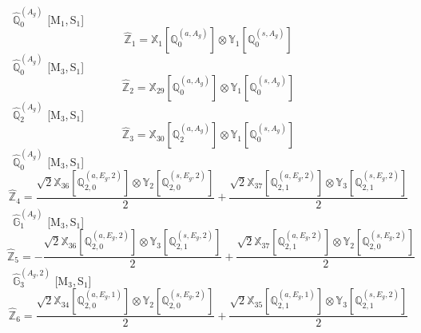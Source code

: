 \documentclass[fleqn,10pt,landscape]{article}
\begin{document}
\begin{itemize}
\vspace{4mm}
\noindent {} $\,\,\,\hat{\mathbb{Q}}_{0}^{(A_{g})}$ [M$_{1}$,\,S$_{1}$]
\begin{dmath*}
\hat{\mathbb{Z}}_{1}=\mathbb{X}_{1}[\mathbb{Q}_{0}^{(a,A_{g})}] \otimes\mathbb{Y}_{1}[\mathbb{Q}_{0}^{(s,A_{g})}]
\end{dmath*}
\vspace{4mm}
\noindent {} $\,\,\,\hat{\mathbb{Q}}_{0}^{(A_{g})}$ [M$_{3}$,\,S$_{1}$]
\begin{dmath*}
\hat{\mathbb{Z}}_{2}=\mathbb{X}_{29}[\mathbb{Q}_{0}^{(a,A_{g})}] \otimes\mathbb{Y}_{1}[\mathbb{Q}_{0}^{(s,A_{g})}]
\end{dmath*}
\vspace{4mm}
\noindent {} $\,\,\,\hat{\mathbb{Q}}_{2}^{(A_{g})}$ [M$_{3}$,\,S$_{1}$]
\begin{dmath*}
\hat{\mathbb{Z}}_{3}=\mathbb{X}_{30}[\mathbb{Q}_{2}^{(a,A_{g})}] \otimes\mathbb{Y}_{1}[\mathbb{Q}_{0}^{(s,A_{g})}]
\end{dmath*}
\vspace{4mm}
\noindent {} $\,\,\,\hat{\mathbb{Q}}_{0}^{(A_{g})}$ [M$_{3}$,\,S$_{1}$]
\begin{dmath*}
\hat{\mathbb{Z}}_{4}=\frac{\sqrt{2} \mathbb{X}_{36}[\mathbb{Q}_{2,0}^{(a,E_{g},2)}] \otimes\mathbb{Y}_{2}[\mathbb{Q}_{2,0}^{(s,E_{g},2)}]}{2} + \frac{\sqrt{2} \mathbb{X}_{37}[\mathbb{Q}_{2,1}^{(a,E_{g},2)}] \otimes\mathbb{Y}_{3}[\mathbb{Q}_{2,1}^{(s,E_{g},2)}]}{2}
\end{dmath*}
\vspace{4mm}
\noindent {} $\,\,\,\hat{\mathbb{G}}_{1}^{(A_{g})}$ [M$_{3}$,\,S$_{1}$]
\begin{dmath*}
\hat{\mathbb{Z}}_{5}=- \frac{\sqrt{2} \mathbb{X}_{36}[\mathbb{Q}_{2,0}^{(a,E_{g},2)}] \otimes\mathbb{Y}_{3}[\mathbb{Q}_{2,1}^{(s,E_{g},2)}]}{2} + \frac{\sqrt{2} \mathbb{X}_{37}[\mathbb{Q}_{2,1}^{(a,E_{g},2)}] \otimes\mathbb{Y}_{2}[\mathbb{Q}_{2,0}^{(s,E_{g},2)}]}{2}
\end{dmath*}
\vspace{4mm}
\noindent {} $\,\,\,\hat{\mathbb{G}}_{3}^{(A_{g},2)}$ [M$_{3}$,\,S$_{1}$]
\begin{dmath*}
\hat{\mathbb{Z}}_{6}=\frac{\sqrt{2} \mathbb{X}_{34}[\mathbb{Q}_{2,0}^{(a,E_{g},1)}] \otimes\mathbb{Y}_{2}[\mathbb{Q}_{2,0}^{(s,E_{g},2)}]}{2} + \frac{\sqrt{2} \mathbb{X}_{35}[\mathbb{Q}_{2,1}^{(a,E_{g},1)}] \otimes\mathbb{Y}_{3}[\mathbb{Q}_{2,1}^{(s,E_{g},2)}]}{2}
\end{dmath*}

\end{itemize}
\end{document}
